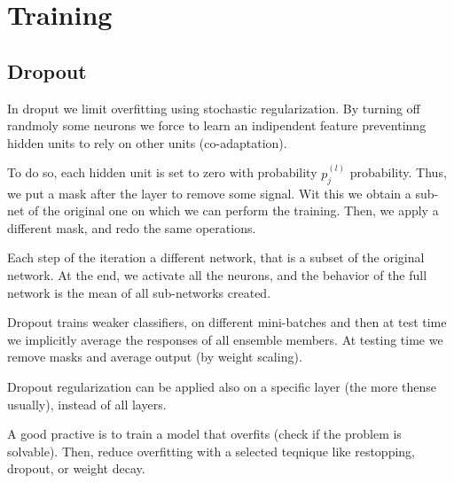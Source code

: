 \section{Training}








\subsection{Dropout}
In droput we limit overfitting using stochastic regularization.
By turning off randmoly some neurons we force to learn an indipendent feature preventinng hidden units to rely on other units (co-adaptation). 

To do so, each hidden unit is set to zero with probability $p_j^{(l)}$ probability.
Thus, we put a mask after the layer to remove some signal. 
Wit this we obtain a sub-net of the original one on which we can perform the training. 
Then, we apply a different mask, and redo the same operations. 

Each step of the iteration a different network, that is a subset of the original network. 
At the end, we activate all the neurons, and the behavior of the full network is the mean of all sub-networks created. 

Dropout trains weaker classifiers, on different mini-batches and then at test time we implicitly average the responses of all ensemble members.
At testing time we remove masks and average output (by weight scaling). 

Dropout regularization can be applied also on a specific layer (the more thense usually), instead of all layers. 

A good practive is to train a model that overfits (check if the problem is solvable).
Then, reduce overfitting with a selected teqnique like restopping, dropout, or weight decay. 
